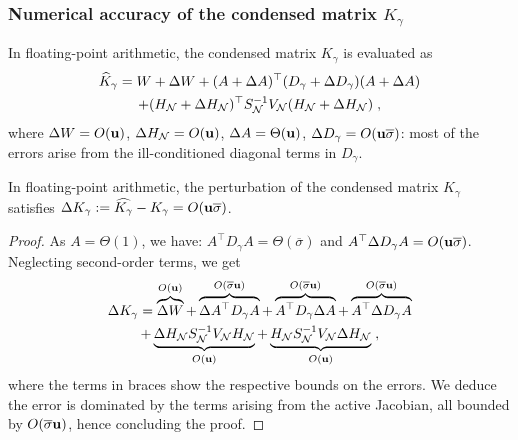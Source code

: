 \subsubsection{Numerical accuracy of the condensed matrix $K_\gamma$}
In floating-point arithmetic, the condensed matrix $K_\gamma$ is evaluated as
\begin{multline*}
  \widehat{K}_\gamma = W + \Delta W + (A + \Delta A)^\top (D_\gamma + \Delta D_\gamma) (A + \Delta A) \\
  + (H_{\mathcal{N}} + \Delta H_{\mathcal{N}})^\top S_{\mathcal{N}}^{-1} V_{\mathcal{N}} (H_{\mathcal{N}} + \Delta H_{\mathcal{N}}) \; ,
\end{multline*}
where $\Delta W = O(\mathbf{u})$, $\Delta H_{\mathcal{N}}  = O(\mathbf{u})$, $ \Delta A  = \Theta(\mathbf{u})$,
$\Delta D_\gamma = O(\mathbf{u} \overline{\sigma})$: most
of the errors arise from the ill-conditioned diagonal terms in $D_\gamma$.
\begin{proposition}
  \label{prop:cond:boundcondensedmatrix}
  In floating-point arithmetic, the perturbation
  of the condensed matrix $K_\gamma$ satisfies
  $\Delta K_\gamma := \widehat{K_\gamma} - K_\gamma  = O(\mathbf{u} \overline{\sigma})$.
\end{proposition}
\begin{proof}
  As $A = \Theta(1)$, we have:
 $A^\top D_\gamma A = \Theta(\overline{\sigma})$ and
  $A^\top \Delta D_\gamma A = O(\mathbf{u} \overline{\sigma})$.
  Neglecting second-order terms, we get
  \begin{multline*}
    \Delta K_\gamma =
    \overbrace{\Delta W}^{O(\mathbf{u})}
    + \overbrace{\Delta A^\top D_\gamma A}^{O(\overline{\sigma}\mathbf{u})}
    + \overbrace{A^\top D_\gamma \Delta A}^{O(\overline{\sigma}\mathbf{u})}
    + \overbrace{A^\top \Delta D_\gamma A}^{O(\overline{\sigma}\mathbf{u})}  \\
    + \underbrace{\Delta H_{\mathcal{N}} S_{\mathcal{N}}^{-1} V_{\mathcal{N}} H_{\mathcal{N}}}_{O(\mathbf{u})}
    + \underbrace{H_{\mathcal{N}} S_{\mathcal{N}}^{-1} V_{\mathcal{N}} \Delta H_{\mathcal{N}} }_{O(\mathbf{u})}
      \; ,
  \end{multline*}
  where the terms in braces show the respective bounds on the errors.
  We deduce the error is dominated by the terms arising from the active Jacobian,
  all bounded by $O(\overline{\sigma} \mathbf{u})$, hence concluding the proof.
\end{proof}

